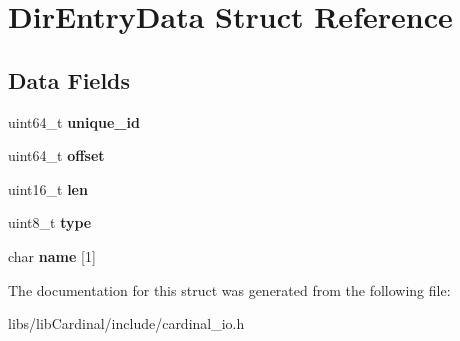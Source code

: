 \hypertarget{structDirEntryData}{}\section{Dir\+Entry\+Data Struct Reference}
\label{structDirEntryData}
\subsection*{Data Fields}
\begin{DoxyCompactItemize}
\item 
uint64\+\_\+t {\bfseries unique\+\_\+id}\hypertarget{structDirEntryData_a3d119051d023ec841397d2aa2435b8c3}{}\label{structDirEntryData_a3d119051d023ec841397d2aa2435b8c3}

\item 
uint64\+\_\+t {\bfseries offset}\hypertarget{structDirEntryData_a8439b7feda3dbf849a03d2d7015dd5d0}{}\label{structDirEntryData_a8439b7feda3dbf849a03d2d7015dd5d0}

\item 
uint16\+\_\+t {\bfseries len}\hypertarget{structDirEntryData_a0fd405cca4d5d2cffb4477e88948fead}{}\label{structDirEntryData_a0fd405cca4d5d2cffb4477e88948fead}

\item 
uint8\+\_\+t {\bfseries type}\hypertarget{structDirEntryData_a174dc8108138cb58574a2ed3307c36f4}{}\label{structDirEntryData_a174dc8108138cb58574a2ed3307c36f4}

\item 
char {\bfseries name} \mbox{[}1\mbox{]}\hypertarget{structDirEntryData_a345ec0e7703c02e6184c13b605fb31e0}{}\label{structDirEntryData_a345ec0e7703c02e6184c13b605fb31e0}

\end{DoxyCompactItemize}


The documentation for this struct was generated from the following file\+:\begin{DoxyCompactItemize}
\item 
libs/lib\+Cardinal/include/cardinal\+\_\+io.\+h\end{DoxyCompactItemize}
